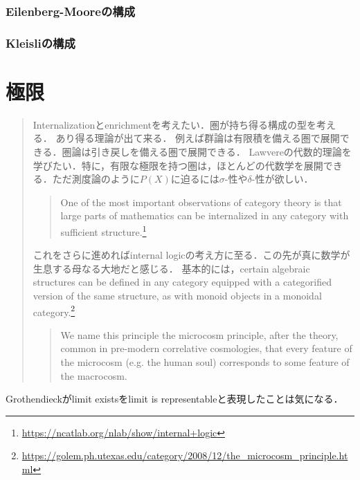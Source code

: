 \documentclass[uplatex,dvipdfmx]{jsreport}
\begin{document}
\subsection{Eilenberg-Mooreの構成}

\subsection{Kleisliの構成}

\chapter{極限}

\begin{quotation}
    Internalizationとenrichmentを考えたい．圏が持ち得る構成の型を考える．
    あり得る理論が出て来る．
    例えば群論は有限積を備える圏で展開できる．圏論は引き戻しを備える圏で展開できる．
    Lawvereの代数的理論を学びたい．特に，有限な極限を持つ圏は，ほとんどの代数学を展開できる．ただ測度論のように$P(X)$に迫るには$\sigma$-性や$\delta$-性が欲しい．
    \begin{quote}
        One of the most important observations of category theory is that large parts of mathematics can be internalized in any category with sufficient structure.\footnote{\url{https://ncatlab.org/nlab/show/internal+logic}}
    \end{quote}
    これをさらに進めればinternal logicの考え方に至る．この先が真に数学が生息する母なる大地だと感じる．
    基本的には，certain algebraic structures can be defined in any category equipped with a categorified version of the same structure, as with monoid objects in a monoidal category.\footnote{\url{https://golem.ph.utexas.edu/category/2008/12/the_microcosm_principle.html}}
    \begin{quote}
        We name this principle the microcosm principle, after the theory, common in pre-modern correlative cosmologies, that every feature of the microcosm (e.g. the human soul) corresponds to some feature of the macrocosm.\cite{John and James}
    \end{quote}
\end{quotation}

\begin{tcolorbox}[colframe=ForestGreen, colback=ForestGreen!10!white, breakable ,colbacktitle=ForestGreen!40!white, coltitle=black,fonttitle=\bfseries\sffamily,
    title=]
    Grothendieckがlimit existsをlimit is representableと表現したことは気になる．
\end{tcolorbox}
\end{document}
